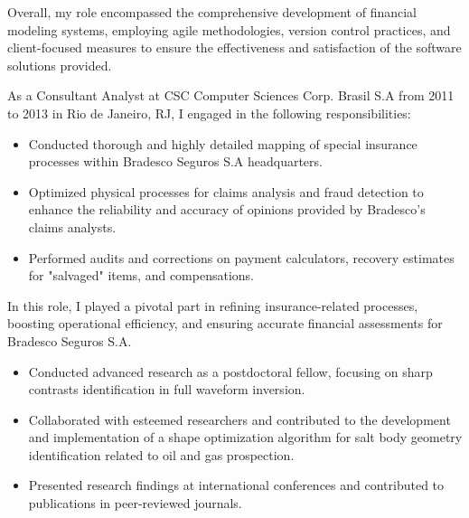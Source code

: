 \documentclass[10pt,a4paper,ragged2e,withhyper,academicons]{altacv}
\begin{document}
\begin{paracol}{1}
Overall, my role encompassed the comprehensive development of financial modeling systems, employing agile methodologies, version control practices, and client-focused measures to ensure the effectiveness and satisfaction of the software solutions provided.

\divider


As a Consultant Analyst at CSC Computer Sciences Corp. Brasil S.A from 2011 to 2013 in Rio de Janeiro, RJ, I engaged in the following responsibilities:

\begin{itemize}
\item Conducted thorough and highly detailed mapping of special insurance processes within Bradesco Seguros S.A headquarters.
\item Optimized physical processes for claims analysis and fraud detection to enhance the reliability and accuracy of opinions provided by Bradesco's claims analysts.
\item Performed audits and corrections on payment calculators, recovery estimates for "salvaged" items, and compensations. 
\end{itemize}
In this role, I played a pivotal part in refining insurance-related processes, boosting operational efficiency, and ensuring accurate financial assessments for Bradesco Seguros S.A.

\begin{itemize}
\item Conducted advanced research as a postdoctoral fellow, focusing on sharp contrasts identification in full waveform inversion. 
\item Collaborated with esteemed researchers and contributed to the development and implementation of a shape optimization algorithm for salt body geometry identification related to oil and gas prospection.
\item Presented research findings at international conferences and contributed to publications in peer-reviewed journals.
\end{itemize}

\divider


\end{paracol}
\end{document}
